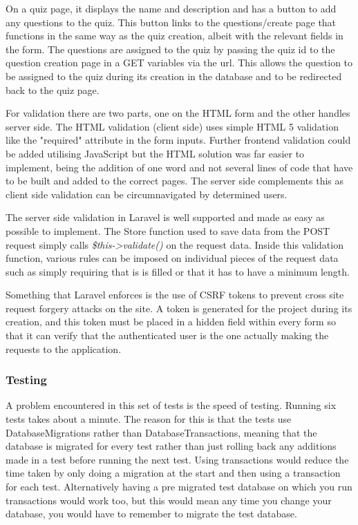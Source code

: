 On a quiz page, it displays the name and description and has a button to add any questions to the quiz. This button links to the questions/create page that functions in the same way as the quiz creation, albeit with the relevant fields in the form. The questions are assigned to the quiz by passing the quiz id to the question creation page in a GET variables via the url. This allows the question to be assigned to the quiz during its creation in the database and to be redirected back to the quiz page.

For validation there are two parts, one on the HTML form and the other handles server side. The HTML validation (client side) uses simple HTML 5 validation like the "required" attribute in the form inputs. Further frontend validation could be added utilising JavaScript but the HTML solution was far easier to implement, being the addition of one word and not several lines of code that have to be built and added to the correct pages. The server side complements this as client side validation can be circumnavigated by determined users.

The server side validation in Laravel is well supported and made as easy as possible to implement. The Store function used to save data from the POST request simply calls \textit{\$this-\textgreater validate()} on the request data. Inside this validation function, various rules can be imposed on individual pieces of the request data such as simply requiring that is is filled or that it has to have a minimum length\cite{laravel-validation}.

Something that Laravel enforces is the use of CSRF tokens to prevent cross site request forgery attacks on the site. A token is generated for the project during its creation, and this token must be placed in a hidden field within every form so that it can verify that the authenticated user is the one actually making the requests to the application\cite{laravel-csrf}.
\subsubsection{Testing}
A problem encountered in this set of tests is the speed of testing. Running six tests takes about a minute. The reason for this is that the tests use DatabaseMigrations rather than DatabaseTransactions, meaning that the database is migrated for every test rather than just rolling back any additions made in a test before running the next test. Using transactions would reduce the time taken by only doing a migration at the start and then using a transaction for each test. Alternatively having a pre migrated test database on which you run transactions would work too, but this would mean any time you change your database, you would have to remember to migrate the test database.

